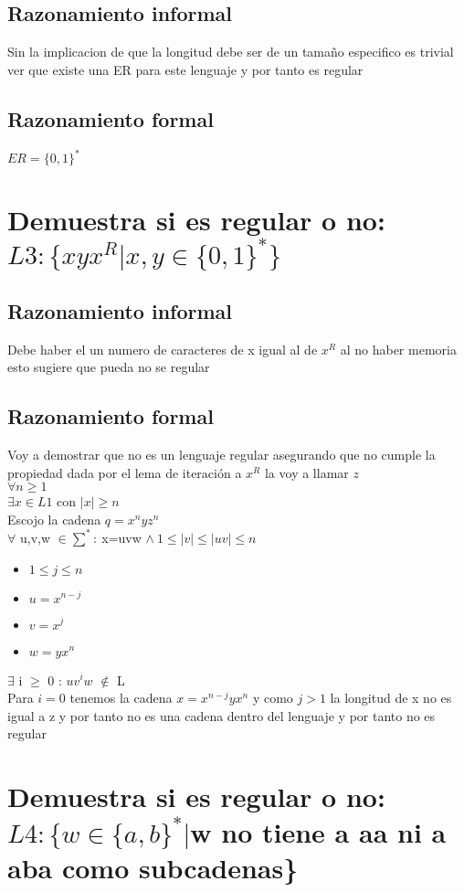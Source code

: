 \documentclass[11pt]{article}
\begin{document}
\subsection{Razonamiento informal}
Sin la implicacion de que la longitud debe ser de un tamaño especifico es trivial ver que existe una ER para este lenguaje y por tanto es regular
\subsection{Razonamiento formal}
$ ER = \{0,1\}^*$
\section{Demuestra si es regular o no:\\ $L3:\{xyx^R|x,y\in\{0,1\}^*\} $}
\subsection{Razonamiento informal}
Debe haber el un numero de caracteres de x igual al de $x^R$ al no haber memoria esto sugiere que pueda no se regular
\subsection{Razonamiento formal}
Voy a demostrar que no es un lenguaje regular asegurando que no cumple la propiedad dada por el lema de iteración a $x^R$ la voy a llamar $z$\\
$\forall n \geq 1$\\
$\exists x \in L1$ con $|x| \geq n$\\
Escojo la cadena $q = x^nyz^n$\\
$\forall$ u,v,w $\in \sum^*:\ $x=uvw $\wedge\ 1 \leq |v| \leq |uv| \leq n$\\
\begin{itemize}
\item$1 \leq j \leq n $
\item$u = x^{n-j}$
\item$v = x^j$
\item$w = yx^n$
\end{itemize}
$\exists$ i $\geq$ 0 : $uv^iw$ $\notin$ L\\
Para $i = 0$ tenemos la cadena $x =x^{n-j}yx^n$ y como $j > 1$ la longitud de x no es igual a z y por tanto no es una cadena dentro del lenguaje y por tanto no es regular
\section{Demuestra si es regular o no:\\ $L4: \{w\in\{a,b\}^*|$w no tiene a aa ni a aba como subcadenas\}}
\end{document}
